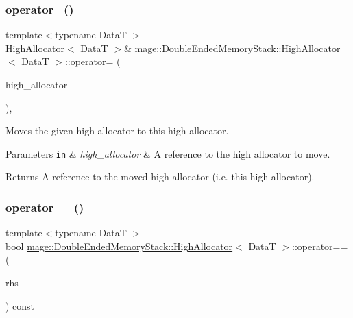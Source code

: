 \subsubsection{\texorpdfstring{operator=()}{operator=()}\hspace{0.1cm}{\footnotesize\ttfamily [2/2]}}
{\footnotesize\ttfamily template$<$typename DataT $>$ \\
\hyperlink{structmage_1_1_double_ended_memory_stack_1_1_high_allocator}{High\+Allocator}$<$ DataT $>$\& \hyperlink{structmage_1_1_double_ended_memory_stack_1_1_high_allocator}{mage\+::\+Double\+Ended\+Memory\+Stack\+::\+High\+Allocator}$<$ DataT $>$\+::operator= (\begin{DoxyParamCaption}\item[{\hyperlink{structmage_1_1_double_ended_memory_stack_1_1_high_allocator}{High\+Allocator}$<$ DataT $>$ \&\&}]{high\+\_\+allocator }\end{DoxyParamCaption})\hspace{0.3cm}{\ttfamily [delete]}, {\ttfamily [noexcept]}}

Moves the given high allocator to this high allocator.


\begin{DoxyParams}[1]{Parameters}
\mbox{\tt in}  & {\em high\+\_\+allocator} & A reference to the high allocator to move. \\
\hline
\end{DoxyParams}
\begin{DoxyReturn}{Returns}
A reference to the moved high allocator (i.\+e. this high allocator). 
\end{DoxyReturn}
\hypertarget{structmage_1_1_double_ended_memory_stack_1_1_high_allocator_a1cc9124a1c31f2162a67662ee996dff4}{}\label{structmage_1_1_double_ended_memory_stack_1_1_high_allocator_a1cc9124a1c31f2162a67662ee996dff4} 
\subsubsection{\texorpdfstring{operator==()}{operator==()}}
{\footnotesize\ttfamily template$<$typename DataT $>$ \\
bool \hyperlink{structmage_1_1_double_ended_memory_stack_1_1_high_allocator}{mage\+::\+Double\+Ended\+Memory\+Stack\+::\+High\+Allocator}$<$ DataT $>$\+::operator== (\begin{DoxyParamCaption}\item[{const \hyperlink{structmage_1_1_double_ended_memory_stack_1_1_high_allocator}{High\+Allocator}$<$ DataT $>$ \&}]{rhs }\end{DoxyParamCaption}) const\hspace{0.3cm}{\ttfamily [noexcept]}}

